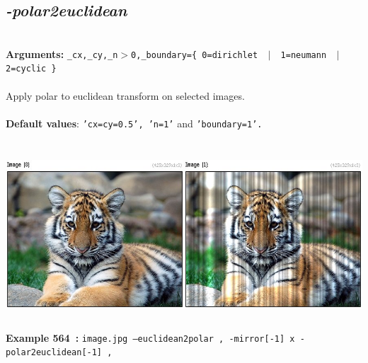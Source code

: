 \documentclass[a4paper,11pt,twoside]{book}
\begin{document}
\subsection{\emph{-polar2euclidean} }\vspace*{-0.5em}
~\\\textbf{Arguments: } 
{\small \texttt{\_cx,\_cy,\_n$>$0,\_boundary=\{ 0=dirichlet ~$|$~ 1=neumann ~$|$~ 2=cyclic \}}}\\~\\
Apply polar to euclidean transform on selected images.
~\\~\\\textbf{Default values}: {\small \texttt{'cx=cy=0.5', 'n=1'} and \texttt{'boundary=1'.}}
\begin{center}\includegraphics[keepaspectratio=true,height=7cm,width=\textwidth]{img/gmic_def564.jpg}\\
{\footnotesize \textbf{Example 564~:} \texttt{image.jpg --euclidean2polar , -mirror[-1] x -polar2euclidean[-1] ,}}
\end{center}
\end{document}
